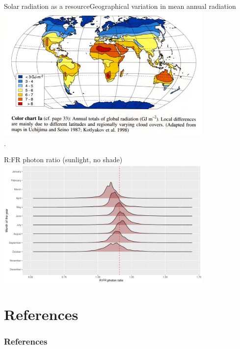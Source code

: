 \documentclass[10pt]{beamer}\usepackage[]{graphicx}\usepackage[]{color}
\begin{document}
\begin{frame}{Solar radiation as a resource}{Geographical variation in mean annual radiation}
    \centering
    \includegraphics[width=0.8\textwidth]{figures/GlobalRadiationMap}\\
    {\small \autocite[From][]{Larcher2003}.}
\end{frame}

\begin{frame}{R:FR photon ratio (sunlight, no shade)}
    \centering
    \includegraphics[width=0.8\textwidth]{figures/r-fr-dens-month-year-fig.pdf}\\
\end{frame}

  \section*{References}
  \nocite{Kotilainen2020,Durand2021,Durand2021a,Robson2019}
  \begin{frame}[t,allowframebreaks]
    \frametitle{References}
    \printbibliography
  \end{frame}
\end{document}

